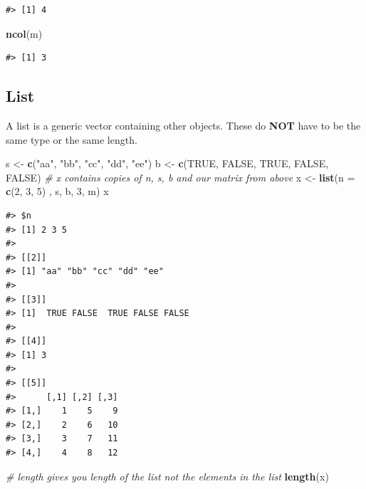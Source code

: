 \documentclass[]{book}
\newenvironment{Shaded}{\begin{snugshade}}{\end{snugshade}}
\newcommand{\KeywordTok}[1]{\textcolor[rgb]{0.13,0.29,0.53}{\textbf{#1}}}
\newcommand{\DataTypeTok}[1]{\textcolor[rgb]{0.13,0.29,0.53}{#1}}
\newcommand{\DecValTok}[1]{\textcolor[rgb]{0.00,0.00,0.81}{#1}}
\newcommand{\StringTok}[1]{\textcolor[rgb]{0.31,0.60,0.02}{#1}}
\newcommand{\CommentTok}[1]{\textcolor[rgb]{0.56,0.35,0.01}{\textit{#1}}}
\newcommand{\OtherTok}[1]{\textcolor[rgb]{0.56,0.35,0.01}{#1}}
\newcommand{\NormalTok}[1]{#1}
\theoremstyle{definition}
\theoremstyle{definition}
\theoremstyle{definition}
\theoremstyle{remark}
\begin{document}
\begin{verbatim}
#> [1] 4
\end{verbatim}

\begin{Shaded}
\begin{Highlighting}[]
\KeywordTok{ncol}\NormalTok{(m)}
\end{Highlighting}
\end{Shaded}

\begin{verbatim}
#> [1] 3
\end{verbatim}

\subsection{List}\label{list}

A list is a generic vector containing other objects. These do
\textbf{NOT} have to be the same type or the same length.

\begin{Shaded}
\begin{Highlighting}[]
\NormalTok{s <-}\StringTok{ }\KeywordTok{c}\NormalTok{(}\StringTok{"aa"}\NormalTok{, }\StringTok{"bb"}\NormalTok{, }\StringTok{"cc"}\NormalTok{, }\StringTok{"dd"}\NormalTok{, }\StringTok{"ee"}\NormalTok{) }
\NormalTok{b <-}\StringTok{ }\KeywordTok{c}\NormalTok{(}\OtherTok{TRUE}\NormalTok{, }\OtherTok{FALSE}\NormalTok{, }\OtherTok{TRUE}\NormalTok{, }\OtherTok{FALSE}\NormalTok{, }\OtherTok{FALSE}\NormalTok{) }
\CommentTok{# x contains copies of n, s, b and our matrix from above}
\NormalTok{x <-}\StringTok{ }\KeywordTok{list}\NormalTok{(}\DataTypeTok{n =} \KeywordTok{c}\NormalTok{(}\DecValTok{2}\NormalTok{, }\DecValTok{3}\NormalTok{, }\DecValTok{5}\NormalTok{) , s, b, }\DecValTok{3}\NormalTok{, m)   }
\NormalTok{x}
\end{Highlighting}
\end{Shaded}

\begin{verbatim}
#> $n
#> [1] 2 3 5
#> 
#> [[2]]
#> [1] "aa" "bb" "cc" "dd" "ee"
#> 
#> [[3]]
#> [1]  TRUE FALSE  TRUE FALSE FALSE
#> 
#> [[4]]
#> [1] 3
#> 
#> [[5]]
#>      [,1] [,2] [,3]
#> [1,]    1    5    9
#> [2,]    2    6   10
#> [3,]    3    7   11
#> [4,]    4    8   12
\end{verbatim}

\begin{Shaded}
\begin{Highlighting}[]
\CommentTok{# length gives you length of the list not the elements in the list}
\KeywordTok{length}\NormalTok{(x)}
\end{Highlighting}
\end{Shaded}
\end{document}
